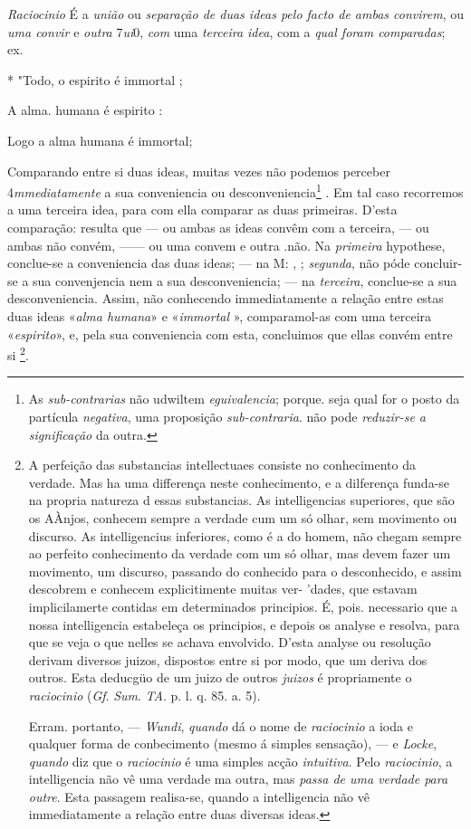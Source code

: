 \emph{Raciocinio} É a \emph{união} ou \emph{separação de duas ideas pelo facto de ambas convirem}, ou \emph{uma convir} e \emph{outra} 7\emph{ui}0, \emph{com} uma \emph{terceira idea}, com a \emph{qual foram comparadas}; ex.

* "Todo, o espirito é immortal ;

A alma. humana é espirito :

Logo a alma humana é immortal;

Comparando entre si duas ideas, muitas vezes não podemos perceber 4\emph{mmediatamente} a sua conveniencia ou desconveniencia\footnote{As \emph{sub-contrarias} não udwiltem \emph{eguivalencia}; porque. seja qual for o posto da partícula \emph{negativa}, uma proposição \emph{sub-contraria}. não pode \emph{reduzir-se a significação} da outra.}  . Em tal caso recorremos a uma terceira idea, para com ella comparar as duas primeiras. D'esta comparação: resulta que --- ou ambas as ideas convêm com a terceira, --- ou ambas não convém, ------ ou uma convem e outra .não. Na \emph{primeira} hypothese, conclue-se a conveniencia das duas ideas; --- na M: , ; \emph{segunda}, não póde concluir-se a sua convenjencia nem a sua desconveniencia; --- na \emph{terceira}, conclue-se a sua desconveniencia. Assim, não conhecendo immediatamente a relação entre estas duas ideas «\emph{alma humana}» e «\emph{immortal} », comparamol-as com uma terceira «\emph{espirito}», e, pela sua conveniencia com esta, concluimos que ellas convém entre si \footnote{A perfeição das substancias intellectuaes consiste no conhecimento da verdade. Mas ha uma differença neste conhecimento, e a dilferença funda-se na propria natureza d essas substancias. As intelligencias superiores, que são os AÀnjos, conhecem sempre a verdade cum um só olhar, sem movimento ou discurso. As intelligencius inferiores, como é a do homem, não chegam sempre ao perfeito conhecimento da verdade com um só olhar, mas devem fazer um movimento, um discurso, passando do conhecido para o desconhecido, e assim descobrem e conhecem explicitimente muitas ver- 'dades, que estavam implicilamerte contidas em determinados principios. É, pois. necessario que a nossa intelligencia estabeleça os principios, e depois os analyse e resolva, para que se veja o que nelles se achava envolvido. D'esta analyse ou resolução derivam diversos juizos, dispostos entre si por modo, que um deriva dos outros. Esta deducgüo de um juizo de outros \emph{juizos} é propriamente o \emph{raciocinio} (\emph{Gf}. \emph{Sum}. \emph{TA}. p. l. q. 85. a. 5).\par Erram. portanto, --- \emph{Wundi}, \emph{quando} dá o nome de \emph{raciocinio} a ioda e qualquer forma de conbecimento (mesmo á simples sensação), --- e \emph{Locke}, \emph{quando} diz que o \emph{raciocinio} é uma simples acção \emph{intuitiva}. Pelo \emph{raciocinio}, a intelligencia não vê uma verdade ma outra, mas \emph{passa de uma verdade para outre}. Esta passagem realisa-se, quando a intelligencia não vê immediatamente a relação entre duas diversas ideas.}.

